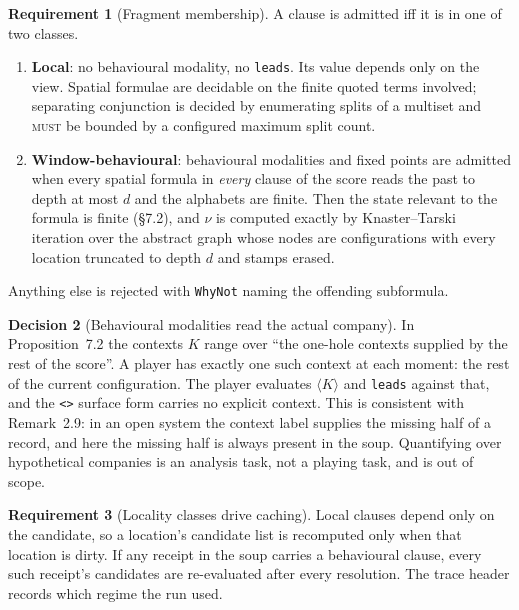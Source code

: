 \documentclass[11pt,a4paper]{article}
\theoremstyle{definition}
\newtheorem{requirement}{Requirement}[section]
\newtheorem{decision}[requirement]{Decision}
\theoremstyle{remark}
\newcommand{\MUST}{\textsc{must}}
\begin{document}
\begin{requirement}[Fragment membership]\label{req:fragment}
A clause is admitted iff it is in one of two classes.
\begin{enumerate}[label=(\roman*),itemsep=1pt]
\item \textbf{Local}: no behavioural modality, no \texttt{leads}. Its value
  depends only on the view. Spatial formulae are decidable on the finite
  quoted terms involved; separating conjunction is decided by enumerating splits
  of a multiset and \MUST{} be bounded by a configured maximum split count.
\item \textbf{Window-behavioural}: behavioural modalities and fixed points are
  admitted when every spatial formula in \emph{every} clause of the score reads
  the past to depth at most $d$ and the alphabets are finite. Then the state
  relevant to the formula is finite (\S7.2), and $\nu$ is computed exactly by
  Knaster--Tarski iteration over the abstract graph whose nodes are
  configurations with every location truncated to depth $d$ and stamps erased.
\end{enumerate}
Anything else is rejected with \texttt{WhyNot} naming the offending subformula.
\end{requirement}

\begin{decision}[Behavioural modalities read the actual company]\label{dec:company}
In Proposition~7.2 the contexts $K$ range over ``the one-hole contexts supplied
by the rest of the score''. A player has exactly one such context at each
moment: the rest of the current configuration. The player evaluates
$\langle K\rangle$ and \texttt{leads} against that, and the \texttt{<>} surface
form carries no explicit context. This is consistent with Remark~2.9: in an
open system the context label supplies the missing half of a record, and here
the missing half is always present in the soup. Quantifying over hypothetical
companies is an analysis task, not a playing task, and is out of scope.
\end{decision}

\begin{requirement}[Locality classes drive caching]\label{req:locality}
Local clauses depend only on the candidate, so a location's candidate list is
recomputed only when that location is dirty. If any receipt in the soup carries
a behavioural clause, every such receipt's candidates are re-evaluated after
every resolution. The trace header records which regime the run used.
\end{requirement}
\end{document}
